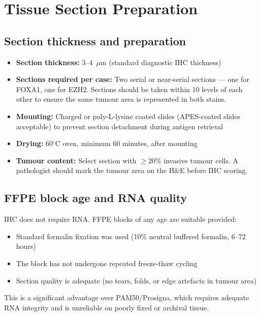 \documentclass[11pt, a4paper]{article}
\begin{document}
\section{Tissue Section Preparation}

\subsection{Section thickness and preparation}

\begin{itemize}
    \item \textbf{Section thickness:} 3--4~$\mu$m
    (standard diagnostic IHC thickness)
    \item \textbf{Sections required per case:}
    Two serial or near-serial sections ---
    one for FOXA1, one for EZH2. Sections should
    be taken within 10 levels of each other to
    ensure the same tumour area is represented
    in both stains.
    \item \textbf{Mounting:} Charged or
    poly-L-lysine coated slides (APES-coated
    slides acceptable) to prevent section
    detachment during antigen retrieval
    \item \textbf{Drying:} 60$^\circ$C oven,
    minimum 60 minutes, after mounting
    \item \textbf{Tumour content:} Select
    section with $\geq 20\%$ invasive tumour
    cells. A pathologist should mark the tumour
    area on the H\&E before IHC scoring.
\end{itemize}

\subsection{FFPE block age and RNA quality}

IHC does not require RNA. FFPE blocks of any
age are suitable provided:
\begin{itemize}[noitemsep]
    \item Standard formalin fixation was used
    (10\% neutral buffered formalin, 6--72 hours)
    \item The block has not undergone repeated
    freeze-thaw cycling
    \item Section quality is adequate (no tears,
    folds, or edge artefacts in tumour area)
\end{itemize}

This is a significant advantage over PAM50/Prosigna,
which requires adequate RNA integrity and is
unreliable on poorly fixed or archival tissue.
\end{document}
